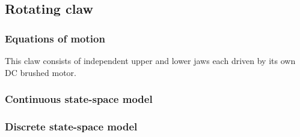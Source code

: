 \subsection{Rotating claw}

\subsubsection{Equations of motion}

This claw consists of independent upper and lower jaws each driven by its own DC
brushed motor.

\subsubsection{Continuous state-space model}

\subsubsection{Discrete state-space model}
